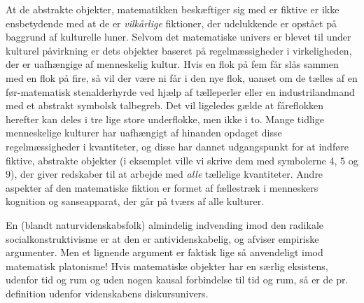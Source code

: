 At de abstrakte objekter, matematikken beskæftiger sig med er fiktive er ikke ensbetydende med at de er \emph{vilkårlige} fiktioner, der udelukkende er opstået på baggrund af kulturelle luner. Selvom det matematiske univers er blevet til under kulturel påvirkning er dets objekter baseret på regelmæssigheder i virkeligheden, der er uafhængige af menneskelig kultur. Hvis en flok på fem får slås sammen med en flok på fire, så vil der være ni får i den nye flok, uanset om de tælles af en før-matematisk stenalderhyrde ved hjælp af tælleperler eller en industrilandmand med et abstrakt symbolsk talbegreb. Det vil ligeledes gælde at fåreflokken herefter kan deles i tre lige store underflokke, men ikke i to. Mange tidlige menneskelige kulturer har uafhængigt af hinanden opdaget disse regelmæssigheder i kvantiteter\cite{heaton}, og disse har dannet udgangspunkt for at indføre fiktive, abstrakte objekter (i eksemplet ville vi skrive dem med symbolerne $4$, $5$ og $9$), der giver redskaber til at arbejde med \emph{alle} tællelige kvantiteter. Andre aspekter af den matematiske fiktion er formet af fællestræk i menneskers kognition og sanseapparat, der går på tværs af alle kulturer.

En (blandt naturvidenskabsfolk) almindelig indvending imod den radikale socialkonstruktivisme er at den er antividenskabelig, og afviser empiriske argumenter. Men et lignende argument er faktisk lige så anvendeligt imod matematisk platonisme! Hvis matematiske objekter har en særlig eksistens, udenfor tid og rum og uden nogen kausal forbindelse til tid og rum, så er de pr. definition udenfor videnskabens diskursunivers.